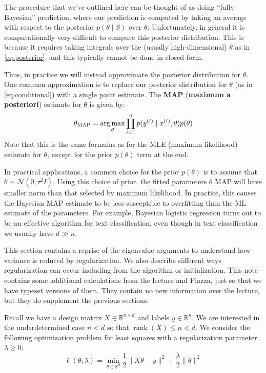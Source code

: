 The procedure that we've outlined here can be thought of as doing ``fully
Bayesian'' prediction, where our prediction is computed by taking an average
with respect to the posterior $p(\theta \mid S)$ over $\theta$. Unfortunately, in general it is
computationally very difficult to compute this posterior distribution. This is
because it requires taking integrals over the (usually high-dimensional) $\theta$ as
in \cref{eq:posterior}, and this typically cannot be done in closed-form.

Thus, in practice we will instead approximate the posterior distribution
for $\theta$. One common approximation is to replace our posterior distribution for
$\theta$ (as in \cref{eq:conditional}) with a single point estimate. The \textbf{MAP} (\textbf{maximum
a posteriori}) estimate for $\theta$ is given by:
\begin{equation}\label{eq:map}
    \theta_\text{MAP} = \argmax_\theta \prod^n_{i=1} p(y^{(i)} \mid x^{(i)}, \theta)p(\theta)    
\end{equation}
Note that this is the same formulas as for the MLE (maximum likelihood)
estimate for $\theta$, except for the prior $p(\theta)$ term at the end.

In practical applications, a common choice for the prior $p(\theta)$ is to assume
that $\theta \sim \mathcal N(0, \tau^2 I)$. Using this choice of prior, the fitted parameters $\theta$ MAP will
have smaller norm than that selected by maximum likelihood. In practice,
this causes the Bayesian MAP estimate to be less susceptible to overfitting
than the ML estimate of the parameters. For example, Bayesian logistic
regression turns out to be an effective algorithm for text classification, even
though in text classification we usually have $d \gg n$.




\vspace{1cm}
This section contains a reprise of the eigenvalue arguments to understand how
variance is reduced by regularization. We also describe different ways
regularization can occur including from the algorithm or initialization. This note
contains some additional calculations from the lecture and Piazza, just so that
we have typeset versions of them. They contain no new information over the
lecture, but they do supplement the previous sections. %

Recall we have a design matrix $X \in \mathbb R^{n \times d}$ and labels $y \in \mathbb R^n$. We are
interested in the underdetermined case $n < d$ so that $\operatorname{rank}(X) \le n < d$. We consider
the following optimization problem for least squares with a regularization
parameter $\lambda \ge 0$:
\begin{equation}
    \ell(\theta;\lambda) = \min_{\theta \in \mathbb R^d} \frac{1}{2} \lVert X \theta - y\rVert^2 + \frac{\lambda}{2} \lVert \theta\rVert^2
\end{equation}

